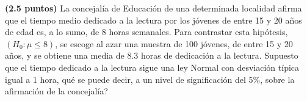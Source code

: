 
\textbf{(2.5 puntos)} La concejalía de Educación de una determinada localidad afirma que el tiempo medio dedicado a la lectura por los jóvenes de entre 15 y 20 años de edad es, a lo sumo, de 8 horas semanales. Para contrastar esta hipótesis, $(H_0:\mu\leq8)$, se escoge al azar una muestra de 100 jóvenes, de entre 15 y 20 años, y se obtiene una media de 8.3 horas de dedicación a la lectura. Supuesto que el tiempo dedicado a la lectura sigue una ley Normal con desviación típica igual a 1 hora, \textquestiondown{}qué se puede decir, a un nivel de significación del 5\%, sobre la afirmación de la concejalía?
